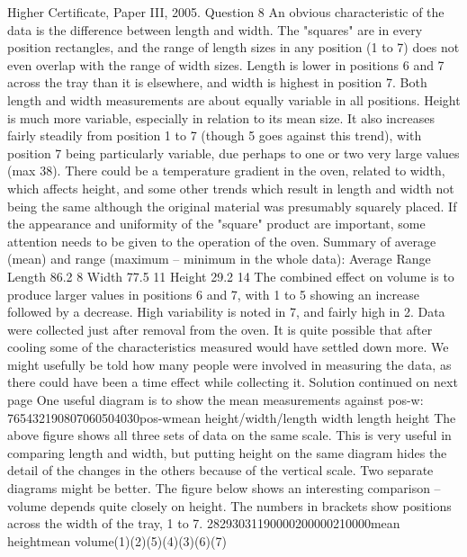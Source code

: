 Higher Certificate, Paper III, 2005. Question 8
An obvious characteristic of the data is the difference between length and width. The "squares" are in every position rectangles, and the range of length sizes in any position (1 to 7) does not even overlap with the range of width sizes. Length is lower in positions 6 and 7 across the tray than it is elsewhere, and width is highest in position 7. Both length and width measurements are about equally variable in all positions.
Height is much more variable, especially in relation to its mean size. It also increases fairly steadily from position 1 to 7 (though 5 goes against this trend), with position 7 being particularly variable, due perhaps to one or two very large values (max 38).
There could be a temperature gradient in the oven, related to width, which affects height, and some other trends which result in length and width not being the same although the original material was presumably squarely placed.
If the appearance and uniformity of the "square" product are important, some attention needs to be given to the operation of the oven.
Summary of average (mean) and range (maximum – minimum in the whole data):
Average Range
Length 86.2 8
Width 77.5 11
Height 29.2 14
The combined effect on volume is to produce larger values in positions 6 and 7, with 1 to 5 showing an increase followed by a decrease. High variability is noted in 7, and fairly high in 2.
Data were collected just after removal from the oven. It is quite possible that after cooling some of the characteristics measured would have settled down more. We might usefully be told how many people were involved in measuring the data, as there could have been a time effect while collecting it.
Solution continued on next page
One useful diagram is to show the mean measurements against pos-w: 765432190807060504030pos-wmean height/width/length
width
length
height
The above figure shows all three sets of data on the same scale. This is very useful in comparing length and width, but putting height on the same diagram hides the detail of the changes in the others because of the vertical scale. Two separate diagrams might be better.
The figure below shows an interesting comparison – volume depends quite closely on height. The numbers in brackets show positions across the width of the tray, 1 to 7. 28293031190000200000210000mean heightmean volume(1)(2)(5)(4)(3)(6)(7)